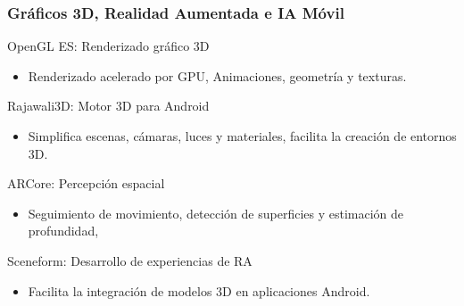 \documentclass[aspectratio=169]{beamer}
\begin{document}
\begin{frame}
\frametitle{Gráficos 3D, Realidad Aumentada e IA Móvil}
\begin{block}{OpenGL ES: Renderizado gráfico 3D}
\begin{itemize}
    \item Renderizado acelerado por GPU, Animaciones, geometría y texturas.
\end{itemize}
\end{block}

\begin{block}{Rajawali3D: Motor 3D para Android}
\begin{itemize}
    \item Simplifica escenas, cámaras, luces y materiales, facilita la creación de entornos 3D.
\end{itemize}
\end{block}


\begin{block}{ARCore: Percepción espacial}
\begin{itemize}
    \item Seguimiento de movimiento, detección de superficies y estimación de profundidad,
\end{itemize}   
\end{block}

\begin{block}{Sceneform: Desarrollo de experiencias de RA}
\begin{itemize}
    \item Facilita la integración de modelos 3D en aplicaciones Android.
\end{itemize}
\end{block}

\vspace{0.15cm}

\begin{center}
\end{center}


\end{frame}
\end{document}
